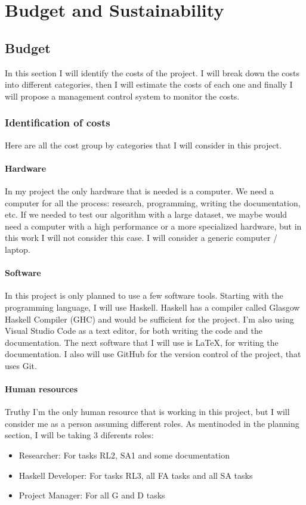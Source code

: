 \chapter{Budget and Sustainability}
\section{Budget}
In this section I will identify the costs of the project. 
I will break down the costs into different categories, then I will estimate the costs of each one and finally I will propose a management control system to monitor the costs.
\subsection{Identification of costs}
Here are all the cost group by categories that I will consider in this project.
\subsubsection*{Hardware}
In my project the only hardware that is needed is a computer.
We need a computer for all the process: research, programming, writing the documentation, etc.
If we needed to test our algorithm with a large dataset, we maybe would need a computer with a high performance or a more specialized hardware, but in this work I will not consider this case.
I will consider a generic computer / laptop.
\subsubsection*{Software}
In this project is only planned to use a few software tools.
Starting with the programming language, I will use Haskell.
Haskell has a compiler called Glasgow Haskell Compiler (GHC) and would be sufficient for the project.
I'm also using Visual Studio Code as a text editor, for both writing the code and the documentation.
The next software that I will use is \LaTeX, for writing the documentation.
I also will use GitHub for the version control of the project, that uses Git.
\subsubsection*{Human resources}
Truthy I'm the only human resource that is working in this project, but I will consider me as a person assuming different roles.
As mentinoded in the planning section, I will be taking 3 diferents roles:
\begin{itemize}
    \item Researcher: For tasks RL2, SA1 and some documentation
    \item Haskell Developer: For tasks RL3, all FA tasks and all SA tasks
    \item Project Manager: For all G and D tasks
\end{itemize}
